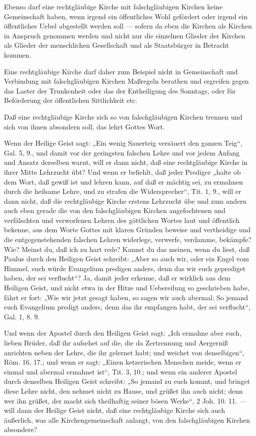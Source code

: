 Ebenso darf eine rechtgläubige Kirche mit falschgläubigen Kirchen keine Gemeinschaft haben, wenn irgend ein öffentliches Wohl gefördert oder irgend ein öffentliches Uebel abgestellt werden soll — sofern da eben die Kirchen als Kirchen in Anspruch genommen werden und nicht nur die einzelnen Glieder der Kirchen als Glieder der menschlichen Gesellschaft und als Staatsbürger in Betracht kommen.

Eine rechtgläubige Kirche darf daher zum Beispiel nicht in Gemeinschaft und Verbindung mit falschgläubigen Kirchen Maßregeln berathen und ergreifen gegen das Laster der Trunkenheit oder das der Entheiligung des Sonntags, oder für Beförderung der öffentlichen Sittlichkeit etc.

Daß eine rechtgläubige Kirche sich so von falschgläubigen Kirchen trennen und sich von ihnen absondern soll, das lehrt Gottes Wort.

Wenn der Heilige Geist sagt: „Ein wenig Sauerteig versäuert den ganzen Teig“, Gal. 5, 9., und damit vor
der geringsten falschen Lehre und vor jedem Anfang und Ansatz derselben warnt, will er dann nicht, daß eine rechtgläubige Kirche in ihrer Mitte Lehrzucht übt? Und wenn er befiehlt, daß jeder Prediger „halte ob dem Wort, daß gewiß ist und lehren kann, auf daß er mächtig sei, zu ermahnen durch die heilsame Lehre, und zu strafen die Widersprecher“, Tit. 1, 9., will er dann nicht, daß die rechtgläubige Kirche erstens Lehrzucht übe und zum andern auch eben gerade die von den falschgläubigen Kirchen angefochtenen und verfälschten und verworfenen Lehren des göttlichen Wortes laut und öffentlich bekenne, aus dem Worte Gottes mit klaren Gründen beweise und vertheidige und die entgegenstehenden falschen Lehren widerlege, verwerfe, verdamme, bekämpfe? Wie? Meinst du, daß ich zu hart rede? Kannst du das meinen, wenn du liest, daß Paulus durch den Heiligen Geist schreibt: „Aber so auch wir, oder ein Engel vom Himmel, euch würde Evangelium predigen anders, denn das wir euch geprediget haben, der sei verflucht“? Ja, damit jeder erkenne, daß er wirklich aus dem Heiligen Geist, und nicht etwa in der Hitze und Uebereilung so geschrieben habe, fährt er fort: „Wie wir jetzt gesagt haben, so sagen wir auch abermal: So jemand euch Evangelium predigt anders, denn das ihr empfangen habt, der sei verflucht“, Gal. 1, 8. 9.

Und wenn der Apostel durch den Heiligen Geist sagt: „Ich ermahne aber euch, lieben Brüder, daß ihr aufsehet auf die, die da Zertrennung und Aergerniß anrichten neben der Lehre, die ihr gelernet habt; und weichet von denselbigen“, Röm. 16, 17.; und wenn er sagt: „Einen ketzerischen Menschen meide, wenn er einmal und abermal ermahnet ist“, Tit. 3, 10.; und wenn ein anderer Apostel durch denselben Heiligen Geist schreibt: „So jemand zu euch kommt, und bringet diese Lehre nicht, den nehmet nicht zu Hause, und grüßet ihn auch nicht; denn wer ihn grüßet, der macht sich theilhaftig seiner bösen Werke“, 2 Joh. 10. 11. — will dann der Heilige Geist nicht, daß eine rechtgläubige Kirche sich auch äußerlich, was alle Kirchengemeinschaft anlangt, von den falschgläubigen Kirchen absondere?

